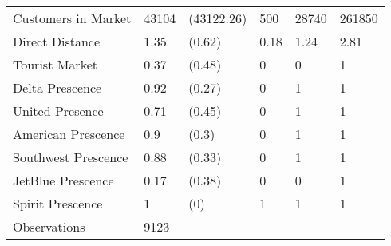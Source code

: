 \begin{tabular}[t]{llllll}
\hspace{1em}Customers in Market & 43104 & (43122.26) & 500 & 28740 & 261850\\
\hspace{1em}Direct Distance & 1.35 & (0.62) & 0.18 & 1.24 & 2.81\\
\hspace{1em}Tourist Market & 0.37 & (0.48) & 0 & 0 & 1\\
\hspace{1em}Delta Prescence & 0.92 & (0.27) & 0 & 1 & 1\\
\hspace{1em}United Presence & 0.71 & (0.45) & 0 & 1 & 1\\
\hspace{1em}American Prescence & 0.9 & (0.3) & 0 & 1 & 1\\
\hspace{1em}Southwest Prescence & 0.88 & (0.33) & 0 & 1 & 1\\
\hspace{1em}JetBlue Prescence & 0.17 & (0.38) & 0 & 0 & 1\\
\hspace{1em}Spirit Prescence & 1 & (0) & 1 & 1 & 1\\
\midrule
\hspace{1em}Observations & 9123 &  &  &  & \\
\bottomrule
\end{tabular}
